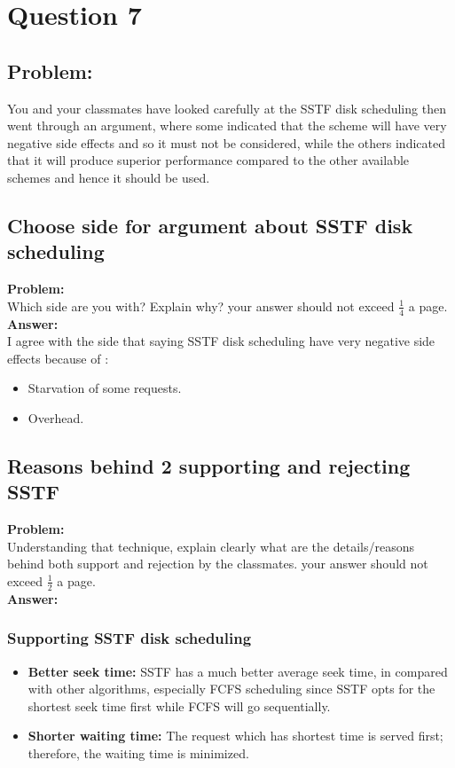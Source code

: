 \newpage
\section{Question 7}
\subsection{Problem:}
You and your classmates have looked carefully at the SSTF disk scheduling then went through
an argument, where some indicated that the scheme will have very negative side effects and so it must
not be considered, while the others indicated that it will produce superior performance compared to the
other available schemes and hence it should be used.

\subsection{Choose side for argument about SSTF disk scheduling}
\textbf{Problem:} \\
Which side are you with? Explain why? your answer should not exceed $\frac{1}{4}$ a page. \\

\textbf{Answer:} \\
I agree with the side that saying SSTF disk scheduling have very negative side effects because of :
\begin{itemize}
    \item Starvation of some requests.
    \item Overhead.
\end{itemize}

\subsection{Reasons behind 2 supporting and rejecting SSTF}
\textbf{Problem:} \\
Understanding that technique, explain clearly what are the details/reasons behind both
support and rejection by the classmates. your answer should not exceed $\frac{1}{2}$ a page. \\

\textbf{Answer:}
\subsubsection{Supporting SSTF disk scheduling}
\begin{itemize}
    \item \textbf{Better seek time: }SSTF has a much better average seek time, in compared with other algorithms, especially FCFS scheduling since SSTF opts for the shortest seek time first while FCFS will go sequentially.
    \item \textbf{Shorter waiting time: } The request which has shortest time is served first; therefore, the waiting time is minimized.
\end{itemize}


